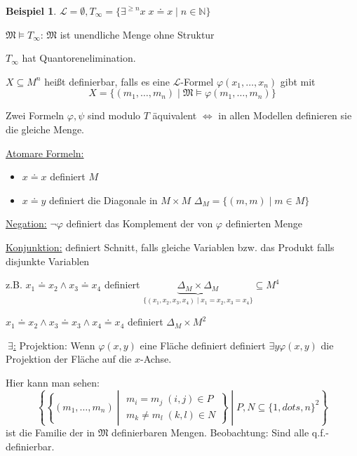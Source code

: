 \documentclass[12pt,parskip=full]{scrartcl}
\newcommand{\setN}{\mathbb{N}}
\newcommand{\Exists}{~\exists}
\newcommand{\heading}{\underline}
\theoremstyle{definition}
\newtheorem{example}[theorem]{Beispiel}
\begin{document}
	\begin{example}
		$\mathcal{L} = \emptyset, T_\infty = \{ \exists^{\geq n} x \; x \doteq x \mid n \in \setN \}$
		
		$\mathfrak{M} \models T_\infty$: $\mathfrak{M}$ ist unendliche Menge ohne Struktur
		
		$T_\infty$ hat Quantorenelimination.
		
		$X \subseteq M^n$ heißt definierbar, falls es eine $\mathcal{L}$-Formel $\varphi(x_1, \dots, x_n)$ gibt mit
		\begin{equation*}
			X = \{ (m_1, \dots, m_n) \mid \mathfrak{M} \models \varphi(m_1, \dots, m_n) \}
		\end{equation*}
		
		Zwei Formeln $\varphi, \psi$ sind modulo $T$ äquivalent $\Leftrightarrow$ in allen Modellen definieren sie die gleiche Menge.
		
		\heading{Atomare Formeln:}
		\begin{itemize}
			\item $x \doteq x$ definiert $M$
			\item $x \doteq y$ definiert die Diagonale in $M \times M$ $\Delta_M = \{ (m,m) \mid m \in M \}$
		\end{itemize}
	
		\heading{Negation:} $\lnot \varphi$ definiert das Komplement der von $\varphi$ definierten Menge
		
		\heading{Konjunktion:} definiert Schnitt, falls gleiche Variablen bzw. das Produkt falls disjunkte Variablen
		
		z.B. $x_1 \doteq x_2 \land x_3 \doteq x_4$ definiert $\underbrace{\Delta_M \times \Delta_M}_{\{ (x_1, x_2, x_3, x_4) \mid x_1 = x_2, x_3 = x_4 \}} \subseteq M^4$
		
		$x_1 \doteq x_2 \land x_3 \doteq x_3 \land x_4 \doteq x_4$ definiert $\Delta_M \times M^2$
		
		\heading{$\Exists$:} Projektion: Wenn $\varphi(x,y)$ eine Fläche definiert definiert $\exists y \varphi(x,y)$ die Projektion der Fläche auf die $x$-Achse.
		
		Hier kann man sehen:
		\begin{equation*}
			\left\{ \left\{ (m_1, \dots, m_n) \middle| \substack{m_i = m_j \; (i,j) \in P \\ m_k \neq m_l \; (k,l) \in N} \right\} \middle| P,N \subseteq \{1,dots, n \}^2  \right\}
		\end{equation*}
		ist die Familie der in $\mathfrak{M}$ definierbaren Mengen. Beobachtung: Sind alle q.f.-definierbar.
	\end{example}
\end{document}
